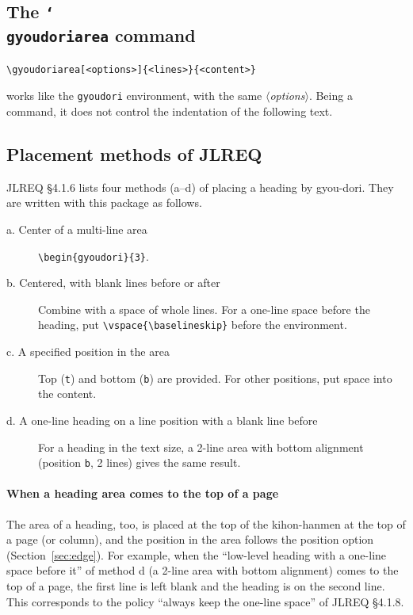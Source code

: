 \documentclass[paper=a4,dvipdfmx]{jlreq}
\newcommand\opt[1]{\texttt{#1}}
\newcommand\env[1]{\texttt{#1}}
\newcommand\cs[1]{\texttt{\char`\\#1}}
\newcommand\meta[1]{$\langle$\textit{#1}$\rangle$}
\begin{document}
\subsection{The \cs{gyoudoriarea} command}

\begin{verbatim}
\gyoudoriarea[<options>]{<lines>}{<content>}
\end{verbatim}
works like the \env{gyoudori} environment, with the same \meta{options}. Being a command, it does not control
the indentation of the following text.

\subsection{Placement methods of JLREQ}\label{sec:pos}

JLREQ \S4.1.6 lists four methods (a--d) of placing a heading by gyou-dori.
They are written with this package as follows.
\begin{description}
\item[a. Center of a multi-line area] \verb|\begin{gyoudori}{3}|.
\item[b. Centered, with blank lines before or after] Combine with a space of
  whole lines. For a one-line space before the heading, put
  \verb|\vspace{\baselineskip}| before the environment.
\item[c. A specified position in the area] Top (\opt{t}) and bottom (\opt{b})
  are provided. For other positions, put space into the content.
\item[d. A one-line heading on a line position with a blank line before] For a
  heading in the text size, a 2-line area with bottom alignment (position
  \opt{b}, 2 lines) gives the same result.
\end{description}
\paragraph{When a heading area comes to the top of a page}
The area of a heading, too, is placed at the top of the kihon-hanmen at the top
of a page (or column), and the position in the area follows the position option
(Section~\ref{sec:edge}). For example, when the ``low-level heading with a
one-line space before it'' of method d (a 2-line area with bottom alignment)
comes to the top of a page, the first line is left blank and the heading is on
the second line. This corresponds to the policy ``always keep the one-line
space'' of JLREQ \S4.1.8.
\end{document}
